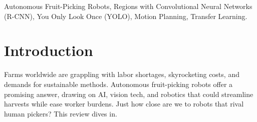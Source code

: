 \documentclass[a4paper,fleqn]{cas-dc}
\begin{document}



\begin{keywords}
 Autonomous Fruit-Picking Robots,
Regions with Convolutional Neural Networks (R-CNN),
You Only Look Once (YOLO),
Motion Planning,
Transfer Learning.
\end{keywords}

\maketitle

\section{Introduction}
Farms worldwide are grappling with labor shortages, skyrocketing costs, and demands for sustainable methods. Autonomous fruit-picking robots offer a promising answer, drawing on AI, vision tech, and robotics that could streamline harvests while ease worker burdens. Just how close are we to robots that rival human pickers? This review dives in. 
\end{document}
